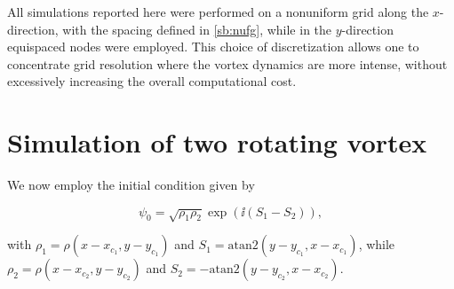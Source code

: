All simulations reported here were performed on a nonuniform grid along the $x$-direction, with the spacing defined in \ref{sb:nufg}, while in the $y$-direction equispaced nodes were employed. This choice of discretization allows one to concentrate grid resolution where the vortex dynamics are more intense, without excessively increasing the overall computational cost.

\section{Simulation of two rotating vortex}

We now employ the initial condition given by 

\[
    \psi_0 = \sqrt{\rho_1 \rho_2}\exp\left(\ii (S_1 - S_2)\right),
\] 

with $\rho_1 = \rho(x - x_{c_1}, y - y_{c_1})$ and $S_1 = \mathrm{atan2}(y - y_{c_1}, x - x_{c_1})$, while $\rho_2 = \rho(x - x_{c_2}, y - y_{c_2})$ and $S_2 = -\mathrm{atan2}(y - y_{c_2}, x - x_{c_2})$.




